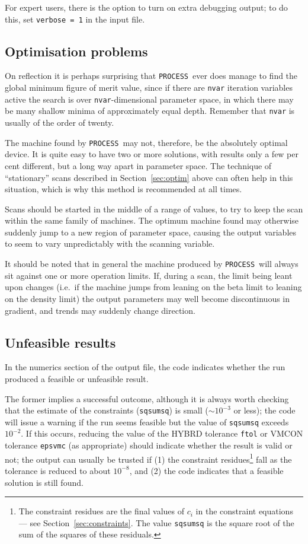 \documentclass[11pt,a4paper]{report}
\newcommand{\process}{\mbox{\texttt{PROCESS}}}
\begin{document}
For expert users, there is the option to turn on extra debugging output; to do
this, set \texttt{verbose = 1} in the input file.

\subsection{Optimisation problems}

On reflection it is perhaps surprising that \process\ ever does manage to
find the global minimum figure of merit value, since if there are
\texttt{nvar} iteration variables active the search is over
\texttt{nvar}-dimensional parameter space, in which there may be many shallow
minima of approximately equal depth. Remember that \texttt{nvar} is usually of
the order of twenty.

The machine found by \process\ may not, therefore, be the absolutely optimal
device. It is quite easy to have two or more solutions, with results only a
few per cent different, but a long way apart in parameter space. The technique
of ``stationary'' scans described in Section~\ref{sec:optim} above can often
help in this situation, which is why this method is recommended at all times.

Scans should be started in the middle of a range of values, to try to keep the
scan within the same family of machines. The optimum machine found may
otherwise suddenly jump to a new region of parameter space, causing the output
variables to seem to vary unpredictably with the scanning variable.

It should be noted that in general the machine produced by \process\ will
always sit against one or more operation limits. If, during a scan, the limit
being leant upon changes (i.e.\ if the machine jumps from leaning on the beta
limit to leaning on the density limit) the output parameters may well become
discontinuous in gradient, and trends may suddenly change direction.

\subsection{Unfeasible results}

In the numerics section of the output file, the code indicates whether the run
produced a feasible or unfeasible result.

The former implies a successful outcome, although it is always worth checking
that the estimate of the constraints (\texttt{sqsumsq}) is small ($\sim
10^{-3}$ or less); the code will issue a warning if the run seems feasible but
the value of \texttt{sqsumsq} exceeds $10^{-2}$. If this occurs, reducing the
value of the HYBRD tolerance \texttt{ftol} or VMCON tolerance \texttt{epsvmc}
(as appropriate) should indicate whether the result is valid or not; the
output can usually be trusted if (1) the constraint residues\footnote{The
  constraint residues are the final values of $c_i$ in the constraint
  equations --- see Section~\ref{sec:constraints}. The value \texttt{sqsumsq}
  is the square root of the sum of the squares of these residuals.} fall as
the tolerance is reduced to about $10^{-8}$, and (2) the code indicates that a
feasible solution is still found.
\end{document}
